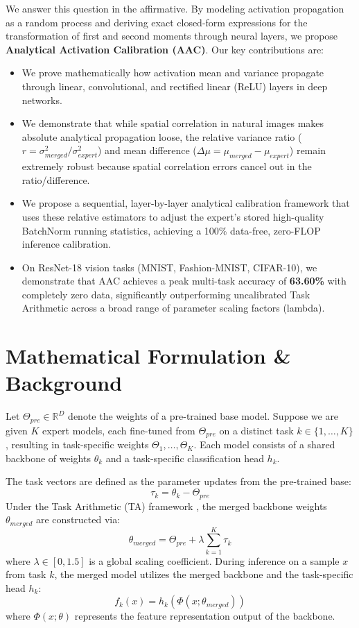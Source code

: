 \documentclass{article}
\theoremstyle{plain}
\theoremstyle{definition}
\theoremstyle{remark}
\begin{document}
We answer this question in the affirmative. By modeling activation propagation as a random process and deriving exact closed-form expressions for the transformation of first and second moments through neural layers, we propose \textbf{Analytical Activation Calibration (AAC)}. Our key contributions are:
\begin{itemize}
    \item We prove mathematically how activation mean and variance propagate through linear, convolutional, and rectified linear (ReLU) layers in deep networks.
    \item We demonstrate that while spatial correlation in natural images makes absolute analytical propagation loose, the relative variance ratio ($r = \sigma^2_{merged}/\sigma^2_{expert}$) and mean difference ($\Delta \mu = \mu_{merged} - \mu_{expert}$) remain extremely robust because spatial correlation errors cancel out in the ratio/difference.
    \item We propose a sequential, layer-by-layer analytical calibration framework that uses these relative estimators to adjust the expert's stored high-quality BatchNorm running statistics, achieving a 100\% data-free, zero-FLOP inference calibration.
    \item On ResNet-18 vision tasks (MNIST, Fashion-MNIST, CIFAR-10), we demonstrate that AAC achieves a peak multi-task accuracy of \textbf{63.60\%} with completely zero data, significantly outperforming uncalibrated Task Arithmetic across a broad range of parameter scaling factors (lambda).
\end{itemize}

\section{Mathematical Formulation \& Background}
\label{sec:formulation}

Let $\Theta_{pre} \in \mathbb{R}^D$ denote the weights of a pre-trained base model. Suppose we are given $K$ expert models, each fine-tuned from $\Theta_{pre}$ on a distinct task $k \in \{1, \dots, K\}$, resulting in task-specific weights $\Theta_1, \dots, \Theta_K$. Each model consists of a shared backbone of weights $\theta_k$ and a task-specific classification head $h_k$.

The task vectors are defined as the parameter updates from the pre-trained base:
\begin{equation}
    \tau_k = \theta_k - \Theta_{pre}
\end{equation}
Under the Task Arithmetic (TA) framework \cite{ilharco2022editing}, the merged backbone weights $\theta_{merged}$ are constructed via:
\begin{equation}
    \theta_{merged} = \Theta_{pre} + \lambda \sum_{k=1}^K \tau_k
\end{equation}
where $\lambda \in [0, 1.5]$ is a global scaling coefficient. During inference on a sample $x$ from task $k$, the merged model utilizes the merged backbone and the task-specific head $h_k$:
\begin{equation}
    f_k(x) = h_k(\Phi(x; \theta_{merged}))
\end{equation}
where $\Phi(x; \theta)$ represents the feature representation output of the backbone.
\end{document}
